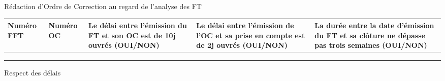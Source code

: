 \begin{center}
	Rédaction d'Ordre de Correction au regard de l'analyse des FT
\end{center}



\begin{table}[H]
\centering
	\begin{tabularx}{16.8cm}{|X|X|X|X|X|}
	\hline
	
	 \cellcolor{gray!40} Numéro FFT &
	 \cellcolor{gray!40} Numéro OC &
	 \cellcolor{gray!40} Le délai entre l'émission du FT et son OC est de 10j ouvrés (OUI/NON) &
	 \cellcolor{gray!40} Le délai entre l'émission de l'OC et sa prise en compte est de 2j ouvrés (OUI/NON) &
	 \cellcolor{gray!40} La durée entre la date d'émission du FT et sa clôture ne dépasse pas trois semaines (OUI/NON)  \\
	
	\hline
	 & & & & \\
	\hline
	 & & & & \\
	\hline
	 & & & & \\
	\hline
	
	
	\end{tabularx}
\end{table}

\begin{center}
	Respect des délais
\end{center}
